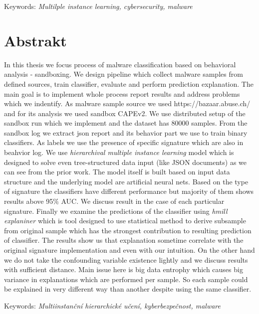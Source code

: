 \documentclass[11pt,twoside,a4paper]{book}
\begin{document}
	\vspace{5mm}

	\noindent Keywords: \emph{Multilple instance learning, cybersecurity, malware}

	\let\cleardoublepage\clearpage

	\noindent
	\chapter*{Abstrakt}
	\noindent
	In this thesis we focus process of malware classification based on behavioral analysis - sandboxing. We design pipeline which collect malware samples from defined sources, train classifier, evaluate and perform prediction explanation. The main goal is to implement whole process report results and address problems which we indentify. As malware sample source we used https://bazaar.abuse.ch/ and for its analysis we used sandbox CAPEv2. We use distributed setup of the sandbox run which we implement and the dataset has $80000$ samples. From the sandbox log we extract json report and its behavior part we use to train binary classifiers. As labels we use the presence of specific signature which are also in beahvior log. We use \emph{hierarchival multiple instance learning} model which is designed to solve even tree-structured data input (like JSON documents) as we can see from the prior work. The model itself is built based on input data structure and the underlying model are artificial neural nets. Based on the type of signature the classifiers have different performance but majority of them shows results above 95\% AUC. We discuss result in the case of each particular signature. Finally we examine the predictions of the classifier using \emph{hmill explaniner} which is tool designed to use statistical method to derive subsample from original sample which has the strongest contribution to resulting prediction of classifier. The results show us that explanation sometime correlate with the original signature implementation and even with our intuition. On the other hand we do not take the confounding variable existence lightly and we discuss results with sufficient distance. Main issue here is big data entrophy which causes big variance in explanations which are performed per sample. So each sample could be explained in very different way than another despite using the same classifier.

	\vspace{5mm}

	\noindent Keywords: \emph{Multiinstanční hierarchické učení, kyberbezpečnost, malware}
\end{document}
